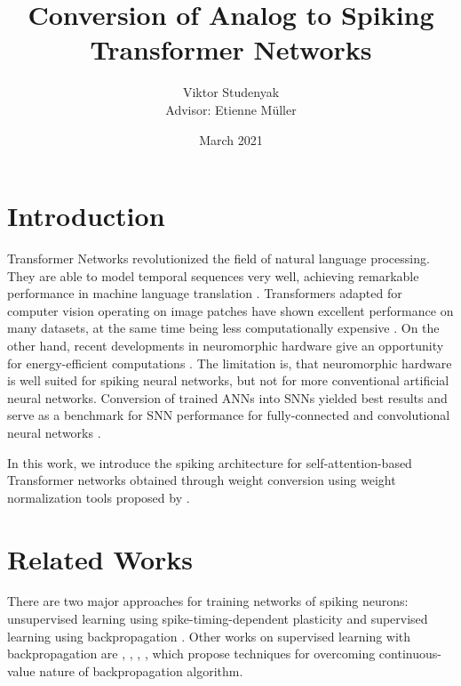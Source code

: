 \documentclass{article}
\title{Conversion of Analog to Spiking Transformer Networks}
\author{Viktor Studenyak\\[0.5cm]{Advisor: Etienne Müller}}
\date{\small March 2021}
\begin{document}
\maketitle

\section{Introduction}

Transformer Networks revolutionized the field of natural language processing. They are able to model temporal sequences very well, achieving remarkable performance in machine language translation \cite{transformer}. Transformers adapted for computer vision operating on image patches have shown excellent performance on many datasets, at the same time being less computationally expensive \cite{vision_transformer}. On the other hand, recent developments in neuromorphic hardware give an opportunity for energy-efficient computations \cite{snn_energy_eff}. The limitation is, that neuromorphic hardware is well suited for spiking neural networks, but not for more conventional artificial neural networks. Conversion of trained ANNs into SNNs yielded best results \cite{snn_overview}  and serve as a  benchmark for SNN performance for fully-connected and convolutional neural networks \cite{dl_in_snn}.

In this work, we introduce the spiking architecture for self-attention-based Transformer networks obtained through weight conversion using weight normalization tools proposed by \cite{rueckauer2016theory}.

\section{Related Works}
There are two major approaches for training networks of spiking neurons: unsupervised learning using spike-timing-dependent plasticity \cite{unsupervised_stdp} and supervised learning using backpropagation \cite{snn_backpropagation}. Other works on supervised learning with backpropagation are \cite{supervised_temporal_coding}, \cite{event_driven_backprop}, \cite{slayer}, \cite{surrogate}, which propose techniques for overcoming continuous-value nature of backpropagation algorithm.
\end{document}
